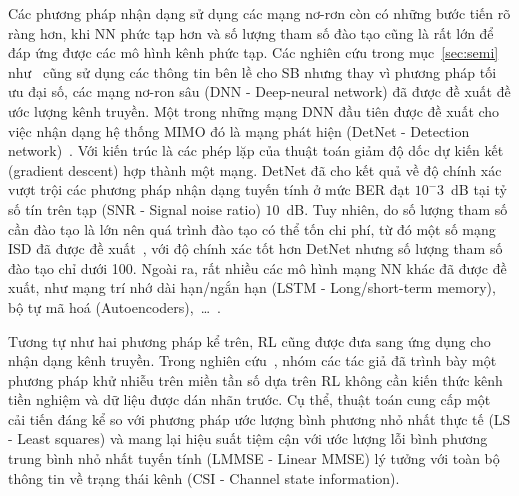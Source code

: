 Các phương pháp nhận dạng sử dụng các mạng nơ-rơn còn có những bước tiến rõ ràng hơn, khi NN phức tạp hơn và số lượng tham số đào tạo cũng là rất lớn để đáp ứng được các mô hình kênh phức tạp. Các nghiên cứu trong mục~\ref{sec:semi} như~\cite{Lin2020, Wan2008} cũng sử dụng các thông tin bên lề cho SB nhưng thay vì phương pháp tối ưu đại số, các mạng nơ-ron sâu (DNN - Deep-neural network) đã được đề xuất đề ước lượng kênh truyền. Một trong những mạng DNN đầu tiên được đề xuất cho việc nhận dạng hệ thống MIMO đó là mạng phát hiện (DetNet - Detection network)~\cite{Samuel2019}. Với kiến trúc là các phép lặp của thuật toán giảm độ dốc dự kiến kết (gradient descent) hợp thành một mạng. DetNet đã cho kết quả về độ chính xác vượt trội các phương pháp nhận dạng tuyến tính ở mức BER đạt $10^-3$~dB tại tỷ số tín trên tạp (SNR - Signal noise ratio) $10$~dB. Tuy nhiên, do số lượng tham số cần đào tạo là lớn nên quá trình đào tạo có thể tốn chi phí, từ đó một số mạng ISD đã được đề xuất~\cite{Mandloi2017, Liao2020}, với độ chính xác tốt hơn DetNet nhưng số lượng tham số đào tạo chỉ dưới 100. Ngoài ra, rất nhiều các mô hình mạng NN khác đã được đề xuất, như mạng trí nhớ dài hạn/ngắn hạn (LSTM - Long/short-term memory), bộ tự mã hoá (Autoencoders),~\ldots~\cite{vilas2022}.

Tương tự như hai phương pháp kể trên, RL cũng được đưa sang ứng dụng cho nhận dạng kênh truyền. Trong nghiên cứu~\cite{Oh2021}, nhóm các tác giả đã trình bày một phương pháp khử nhiễu trên miền tần số dựa trên RL không cần kiến thức kênh tiền nghiệm và dữ liệu được dán nhãn trước. Cụ thể, thuật toán cung cấp một cải tiến đáng kể so với phương pháp ước lượng bình phương nhỏ nhất thực tế (LS - Least squares) và mang lại hiệu suất tiệm cận với ước lượng lỗi bình phương trung bình nhỏ nhất tuyến tính (LMMSE - Linear MMSE) lý tưởng với toàn bộ thông tin về trạng thái kênh (CSI - Channel state information).